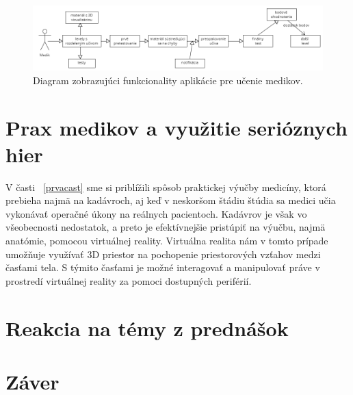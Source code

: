 \documentclass[10pt,twoside,slovak,a4paper]{article}
\begin{document}
\begin{figure}[tbh]
\centering
\includegraphics[scale=0.35]{dia.png}
\caption{Diagram zobrazujúci funkcionality aplikácie pre učenie medikov.}
\label{diagram}
\end{figure}






\section{Prax medikov a využitie serióznych hier} \label{tretiacast}
V časti ~\ref{prvacast} sme si priblížili spôsob praktickej výučby medicíny, ktorá prebieha najmä na kadávroch, aj keď v neskoršom štádiu štúdia sa medici učia vykonávať operačné úkony na reálnych pacientoch. Kadávrov je však vo všeobecnosti nedostatok, a preto je efektívnejšie pristúpiť na výučbu, najmä anatómie, pomocou virtuálnej reality. Virtuálna realita nám v tomto prípade umožňuje využívať 3D priestor na pochopenie priestorových vzťahov medzi časťami tela. S týmito časťami je možné interagovať a manipulovať práve v prostredí virtuálnej reality za pomoci dostupných periférií.  \cite{9678721}



\section{Reakcia na témy z prednášok} \label{prednasky}


\section{Záver} \label{zaver} 





\end{document}
